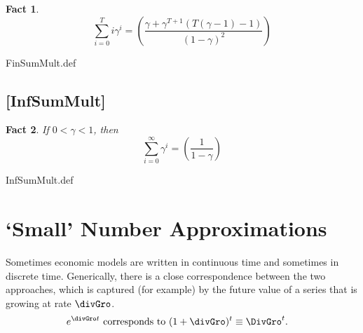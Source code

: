 \documentclass{handout}
\newtheorem{Fact}{Fact}
\begin{document}

\begin{Fact} 
\begin{equation}
\displaystyle \sum_{i=0}^{T} i \gamma^{i} = \left(\frac{\gamma + \gamma^{T+1}(T(\gamma-1)-1)}{(1-\gamma)^{2}}\right)
\end{equation} 
\end{Fact}

\begin{verbatimwrite}{FinSumMult.def}
\providecommand{\FinSumMult}{\href{https://www.econ2.jhu.edu/people/ccarroll/public/LectureNotes/MathFacts/MathFactsList\#FinSumMult}{\ensuremath{\mathtt{[FinSumMult]}}}}
\end{verbatimwrite}


\hypertarget{InfSumMult}{}

\subsection{[InfSumMult]}\label{fact:InfSumMult}


\begin{Fact} If $0 < \gamma < 1$, then 
\begin{equation}
\displaystyle \sum_{i=0}^{\infty} \gamma^{i} = \left(\frac{1}{1-\gamma}\right)
\end{equation}
\end{Fact}

\begin{verbatimwrite}{InfSumMult.def}
\providecommand{\InfSumMult}{\href{https://www.econ2.jhu.edu/people/ccarroll/public/LectureNotes/MathFacts/MathFactsList\#InfSumMult}{\ensuremath{\mathtt{[InfSumMult]}}}}
\end{verbatimwrite}

\medskip
\section{`Small' Number Approximations}

Sometimes economic models are written in continuous time and sometimes
in discrete time.  Generically, there is a close
correspondence between the two approaches, which is captured (for
example) by the future value of a series that is growing at rate
$\divGro$.  
\begin{equation}\begin{gathered}\begin{aligned}
  e^{\divGro t} & \text{~corresponds to~}  (1+\divGro)^{t} \equiv \DivGro^{t}.
\end{aligned}\end{gathered}\end{equation}
\end{document}
